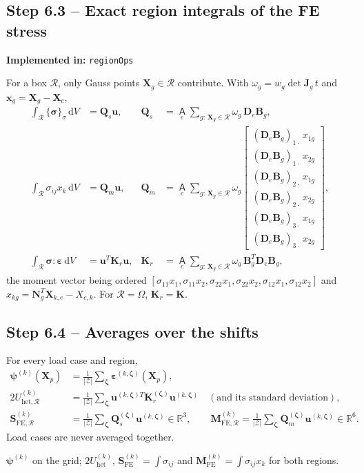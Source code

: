 \documentclass[11pt,a4paper]{article}
\newcommand{\Dm}{\mathbf{D}}                    %
\newcommand{\eps}{\bm{\varepsilon}}
\newcommand{\bpsi}{\bm{\psi}}
\newcommand{\bsig}{\bm{\sigma}}
\newcommand{\bx}{\bm{x}}
\newcommand{\bX}{\bm{X}}
\newcommand{\bu}{\bm{u}}
\newcommand{\bK}{\bm{K}}
\newcommand{\dd}{\,\mathrm{d}}
\newcommand{\vs}[1]{\{#1\}_{\sigma}}           %
\newcommand{\Zset}{\mathcal{Z}}
\newcommand{\code}[1]{\texttt{#1}}
\theoremstyle{plain}
\theoremstyle{remark}
\newcommand{\implementedin}[1]{\begin{codebox}\textbf{Implemented in:} #1\end{codebox}}
\begin{document}
\subsection*{Step 6.3 -- Exact region integrals of the FE stress}
\implementedin{\code{regionOps}}
For a box $\mathcal R$, only Gauss points $\bX_g\in\mathcal R$ contribute. With
$\omega_g=w_g\det\bm J_g\,t$ and $\bx_g=\bX_g-\bX_c$,
\begin{align}
  \int_{\mathcal R}\vs{\bsig}\dd V&=\bm Q_s\bu, &
  \bm Q_s&=\operatorname*{\mathsf{A}}_e\sum_{g:\,\bX_g\in\mathcal R}\omega_g\,\Dm_e\bm B_g,
  \label{eq:Qs}\\
  \int_{\mathcal R}\sigma_{ij}x_k\dd V&=\bm Q_m\bu, &
  \bm Q_m&=\operatorname*{\mathsf{A}}_e\sum_{g:\,\bX_g\in\mathcal R}\omega_g
  \begin{bmatrix}(\Dm_e\bm B_g)_{1\cdot}\,x_{1g}\\(\Dm_e\bm B_g)_{1\cdot}\,x_{2g}\\
  (\Dm_e\bm B_g)_{2\cdot}\,x_{1g}\\(\Dm_e\bm B_g)_{2\cdot}\,x_{2g}\\
  (\Dm_e\bm B_g)_{3\cdot}\,x_{1g}\\(\Dm_e\bm B_g)_{3\cdot}\,x_{2g}\end{bmatrix},
  \label{eq:Qm}\\
  \int_{\mathcal R}\bsig:\eps\dd V&=\bu^T\bK_r\bu, &
  \bK_r&=\operatorname*{\mathsf{A}}_e\sum_{g:\,\bX_g\in\mathcal R}\omega_g\,\bm B_g^T\Dm_e\bm B_g ,
  \label{eq:Kr}
\end{align}
the moment vector being ordered
$[\sigma_{11}x_1,\sigma_{11}x_2,\sigma_{22}x_1,\sigma_{22}x_2,\sigma_{12}x_1,\sigma_{12}x_2]$ and
$x_{kg}=\bm N_g^T\bm X_{k,e}-X_{c,k}$. For $\mathcal R=\Omega$, $\bK_r=\bK$.

\subsection*{Step 6.4 -- Averages over the shifts}
For every load case and region,
\begin{align}
  \bpsi^{(k)}(\bX_p)&=\frac1{|\Zset|}\sum_{\bm\zeta}\eps^{(k,\bm\zeta)}(\bX_p),
  \label{eq:psi}\\
  2U^{(k)}_{\mathrm{het},\mathcal R}&=\frac1{|\Zset|}\sum_{\bm\zeta}\bu^{(k,\bm\zeta)T}\bK_r^{(\bm\zeta)}\bu^{(k,\bm\zeta)}
  \quad(\text{and its standard deviation}),\\
  \bm S^{(k)}_{\mathrm{FE},\mathcal R}&=\frac1{|\Zset|}\sum_{\bm\zeta}\bm Q_s^{(\bm\zeta)}\bu^{(k,\bm\zeta)}\in\mathbb R^3,\qquad
  \bm M^{(k)}_{\mathrm{FE},\mathcal R}=\frac1{|\Zset|}\sum_{\bm\zeta}\bm Q_m^{(\bm\zeta)}\bu^{(k,\bm\zeta)}\in\mathbb R^6 .
  \label{eq:SMfe}
\end{align}
Load cases are never averaged together.
\begin{delivers}
$\bpsi^{(k)}$ on the grid; $2U^{(k)}_{\mathrm{het}}$, $\bm S^{(k)}_{\mathrm{FE}}=\int\sigma_{ij}$ and
$\bm M^{(k)}_{\mathrm{FE}}=\int\sigma_{ij}x_k$ for both regions.
\end{delivers}
\end{document}

